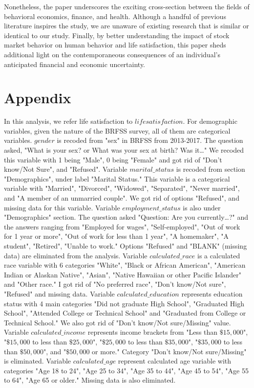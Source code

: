 \documentclass[11pt,a4paper,oldfontcommands]{memoir}
\begin{document}
{\begin{footnotesize}
Nonetheless, the paper underscores the exciting cross-section between the fields of behavioral economics, finance, and health. Although a handful of previous literature inspires the study, we are unaware of existing research that is similar or identical to our study. Finally, by better understanding the impact of stock market behavior on human behavior and life satisfaction, this paper sheds additional light on the contemporaneous consequences of an individual's anticipated financial and economic uncertainty.

\section{Appendix}

In this analysis, we refer life satisfaction to $life satisfaction$. For demographic variables, given the nature of the BRFSS survey, all of them are categorical variables. $gender$ is recoded from "sex" in BRFSS from 2013-2017. The question asked, "What is your sex? or What was your sex at birth? Was it…" We recoded this variable with 1 being "Male", 0 being "Female" and got rid of "Don't know/Not Sure", and "Refused". Variable $marital\_status$ is recoded from section "Demographics", under label "Marital Status." This variable is a categorical variable with "Married", "Divorced", "Widowed", "Separated", "Never married", and "A member of an unmarried couple". We got rid of options "Refused", and missing data for this variable. Variable $employment\_status$ is also under "Demographics" section. The question asked "Question: Are you currently…?" and the answers ranging from "Employed for wages", "Self-employed", "Out of work for 1 year or more", "Out of work for less than 1 year", "A homemaker", "A student", "Retired", "Unable to work." Options "Refused" and "BLANK" (missing data) are eliminated from the analysis. Variable $calculated\_race$ is a calculated race variable with 6 categories "White", "Black or African American", "American Indian or Alaskan Native", "Asian", "Native Hawaiian or other Pacific Islander" and "Other race." I got rid of "No preferred race", "Don't know/Not sure", "Refused" and missing data. Variable $calculated\_education$ represents education status with 4 main categories "Did not graduate High School", "Graduated High School", "Attended College or Technical School" and "Graduated from College or Technical School." We also got rid of "Don't know/Not sure/Missing" value. Variable $calculated\_income$ represents income brackets from "Less than $\$15,000$", "$\$15,000$ to less than $\$25,000$", "$\$25,000$ to less than $\$35,000$", "$\$35,000$ to less than $\$50,000$", and "$\$50,000$ or more." Category "Don’t know/Not sure/Missing" is eliminated. Variable $calculated\_age$ represent calculated age variable with categories "Age 18 to 24", "Age 25 to 34", "Age 35 to 44", "Age 45 to 54", "Age 55 to 64", "Age 65 or older."  Missing data is also eliminated. 


\end{footnotesize}}
\end{document}
